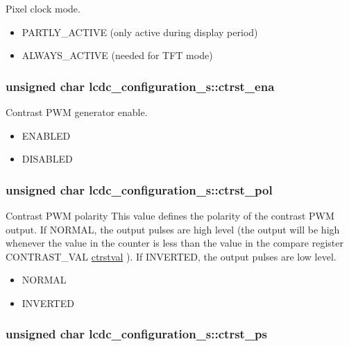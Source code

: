 Pixel clock mode. 

\begin{itemize}
\item PARTLY\_\-ACTIVE (only active during display period) \item ALWAYS\_\-ACTIVE (needed for TFT mode) \end{itemize}
\hypertarget{structlcdc__configuration__s_01ba7740730856ce7d608653cf7f1eaa}{
\subsubsection[{ctrst\_\-ena}]{\setlength{\rightskip}{0pt plus 5cm}unsigned char {\bf lcdc\_\-configuration\_\-s::ctrst\_\-ena}}}
\label{structlcdc__configuration__s_01ba7740730856ce7d608653cf7f1eaa}


Contrast PWM generator enable. 

\begin{itemize}
\item ENABLED \item DISABLED \end{itemize}
\hypertarget{structlcdc__configuration__s_4e933794a6cfe4618b226d15b04a2ea2}{
\subsubsection[{ctrst\_\-pol}]{\setlength{\rightskip}{0pt plus 5cm}unsigned char {\bf lcdc\_\-configuration\_\-s::ctrst\_\-pol}}}
\label{structlcdc__configuration__s_4e933794a6cfe4618b226d15b04a2ea2}


Contrast PWM polarity This value defines the polarity of the contrast PWM output. If NORMAL, the output pulses are high level (the output will be high whenever the value in the counter is less than the value in the compare register CONTRAST\_\-VAL \hyperlink{structlcdc__configuration__s_63e7bb2ad3e2a853d47e495a78d87d49}{ctrstval} ). If INVERTED, the output pulses are low level. 

\begin{itemize}
\item NORMAL \item INVERTED \end{itemize}
\hypertarget{structlcdc__configuration__s_c2eb547fd86497e3e57a46ea4e712881}{
\subsubsection[{ctrst\_\-ps}]{\setlength{\rightskip}{0pt plus 5cm}unsigned char {\bf lcdc\_\-configuration\_\-s::ctrst\_\-ps}}}
\label{structlcdc__configuration__s_c2eb547fd86497e3e57a46ea4e712881}


